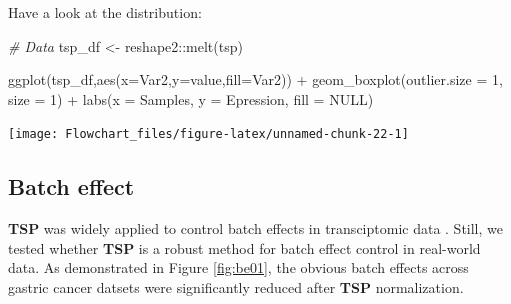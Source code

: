 \documentclass[
  12pt,
]{book}
\newenvironment{Shaded}{\begin{snugshade}}{\end{snugshade}}
\newcommand{\AttributeTok}[1]{\textcolor[rgb]{0.77,0.63,0.00}{#1}}
\newcommand{\CommentTok}[1]{\textcolor[rgb]{0.56,0.35,0.01}{\textit{#1}}}
\newcommand{\ConstantTok}[1]{\textcolor[rgb]{0.00,0.00,0.00}{#1}}
\newcommand{\DecValTok}[1]{\textcolor[rgb]{0.00,0.00,0.81}{#1}}
\newcommand{\FunctionTok}[1]{\textcolor[rgb]{0.00,0.00,0.00}{#1}}
\newcommand{\NormalTok}[1]{#1}
\newcommand{\OtherTok}[1]{\textcolor[rgb]{0.56,0.35,0.01}{#1}}
\newcommand{\SpecialCharTok}[1]{\textcolor[rgb]{0.00,0.00,0.00}{#1}}
\newcommand{\StringTok}[1]{\textcolor[rgb]{0.31,0.60,0.02}{#1}}
\begin{document}
Have a look at the distribution:

\begin{Shaded}
\begin{Highlighting}[]

\CommentTok{\# Data}
\NormalTok{tsp\_df }\OtherTok{\textless{}{-}}\NormalTok{ reshape2}\SpecialCharTok{::}\FunctionTok{melt}\NormalTok{(tsp)}

\FunctionTok{ggplot}\NormalTok{(tsp\_df,}\FunctionTok{aes}\NormalTok{(}\AttributeTok{x=}\NormalTok{Var2,}\AttributeTok{y=}\NormalTok{value,}\AttributeTok{fill=}\NormalTok{Var2)) }\SpecialCharTok{+} 
      \FunctionTok{geom\_boxplot}\NormalTok{(}\AttributeTok{outlier.size =} \DecValTok{1}\NormalTok{, }\AttributeTok{size =} \DecValTok{1}\NormalTok{) }\SpecialCharTok{+} 
      \FunctionTok{labs}\NormalTok{(}\AttributeTok{x =} \StringTok{\textquotesingle{}Samples\textquotesingle{}}\NormalTok{,}
           \AttributeTok{y =} \StringTok{\textquotesingle{}Epression\textquotesingle{}}\NormalTok{,}
           \AttributeTok{fill =} \ConstantTok{NULL}\NormalTok{) }
\end{Highlighting}
\end{Shaded}

\begin{center}\texttt{[image: Flowchart\_files/figure-latex/unnamed-chunk-22-1]} \end{center}

\hypertarget{batch-effect}{%
\subsection{Batch effect}\label{batch-effect}}

\textbf{TSP} was widely applied to control batch effects in transciptomic data \citep{RN369, RN367, RN368, RN364, RN363, RN362, RN366, RN365}. Still, we tested whether \textbf{TSP} is a robust method for batch effect control in real-world data. As demonstrated in Figure \ref{fig:be01}, the obvious batch effects across gastric cancer datsets were significantly reduced after \textbf{TSP} normalization.
\end{document}
